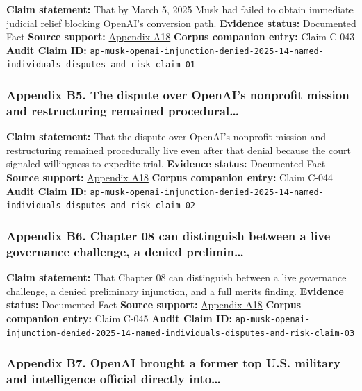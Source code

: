 \documentclass[
  american,
  11pt,
  letterpaper,
]{article}
\begin{document}
\textbf{Claim statement:} That by March 5, 2025 Musk had failed to
obtain immediate judicial relief blocking OpenAI's conversion path.
\textbf{Evidence status:} Documented Fact \textbf{Source support:}
\hyperref[ch-08-appendix-a18-judge-denies-elon-musk-s-request-to-block-openai-for-profit-conversion-but-welcomes-trial]{Appendix
A18} \textbf{Corpus companion entry:} Claim C-043 \textbf{Audit Claim
ID:}
\texttt{ap-musk-openai-injunction-denied-2025-14-named-individuals-disputes-and-risk-claim-01}

\subsubsection{Appendix B5. The dispute over OpenAI's nonprofit mission
and restructuring remained
procedural\ldots{}}\label{ch-08-appendix-b5-the-dispute-over-openai-s-nonprofit-mission-and-restructuring-remained-procedural}

\textbf{Claim statement:} That the dispute over OpenAI's nonprofit
mission and restructuring remained procedurally live even after that
denial because the court signaled willingness to expedite trial.
\textbf{Evidence status:} Documented Fact \textbf{Source support:}
\hyperref[ch-08-appendix-a18-judge-denies-elon-musk-s-request-to-block-openai-for-profit-conversion-but-welcomes-trial]{Appendix
A18} \textbf{Corpus companion entry:} Claim C-044 \textbf{Audit Claim
ID:}
\texttt{ap-musk-openai-injunction-denied-2025-14-named-individuals-disputes-and-risk-claim-02}

\subsubsection{Appendix B6. Chapter 08 can distinguish between a live
governance challenge, a denied
prelimin\ldots{}}\label{ch-08-appendix-b6-chapter-08-can-distinguish-between-a-live-governance-challenge-a-denied-prelimin}

\textbf{Claim statement:} That Chapter 08 can distinguish between a live
governance challenge, a denied preliminary injunction, and a full merits
finding. \textbf{Evidence status:} Documented Fact \textbf{Source
support:}
\hyperref[ch-08-appendix-a18-judge-denies-elon-musk-s-request-to-block-openai-for-profit-conversion-but-welcomes-trial]{Appendix
A18} \textbf{Corpus companion entry:} Claim C-045 \textbf{Audit Claim
ID:}
\texttt{ap-musk-openai-injunction-denied-2025-14-named-individuals-disputes-and-risk-claim-03}

\subsubsection{Appendix B7. OpenAI brought a former top U.S. military
and intelligence official directly
into\ldots{}}\label{ch-08-appendix-b7-openai-brought-a-former-top-u-s-military-and-intelligence-official-directly-into}
\end{document}
